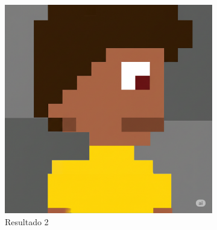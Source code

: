 \begin{figure}[htbp]
\begin{subfigure}{0.3\linewidth}
        \includegraphics[width=1\linewidth]{figs/geminiPro/chat6/tela1_res2.png}
        \caption{\small Resultado 2}
        \label{fig:geminiPro17b}
    \end{subfigure}
    \begin{subfigure}{0.3\linewidth}

\end{subfigure}
\end{figure}
